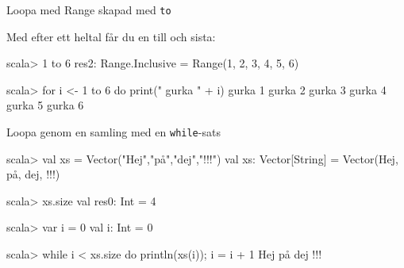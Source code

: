 \begin{Slide}{Loopa med Range skapad med \texttt{to}}

Med  efter ett heltal får du en  till och  sista:
\begin{REPLnonum}
scala> 1 to 6
res2: Range.Inclusive =
  Range(1, 2, 3, 4, 5, 6)

scala> for i <- 1 to 6 do print(" gurka " + i)
 gurka 1 gurka 2 gurka 3 gurka 4 gurka 5 gurka 6

\end{REPLnonum}


\end{Slide}

\begin{Slide}{Loopa genom en samling med en \texttt{while}-sats}
\begin{REPLnonum}
scala> val xs = Vector("Hej","på","dej","!!!")
val xs: Vector[String] =
  Vector(Hej, på, dej, !!!)

scala> xs.size
val res0: Int = 4

scala> var i = 0
val i: Int = 0

scala> while i < xs.size do { println(xs(i)); i = i + 1 }
Hej
på
dej
!!!
\end{REPLnonum}
\end{Slide}


